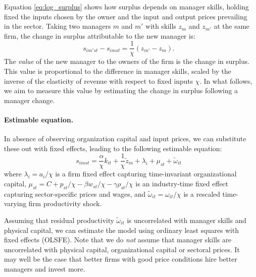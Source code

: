\documentclass[11pt,a4paper]{article}
\begin{document}
Equation \eqref{eq:log_surplus} shows how surplus depends on manager skills, holding fixed the inputs chosen by the owner and the input and output prices prevailing in the sector. Taking two managers $m$ and $m'$ with skills ${z}_m$ and ${z}_{m'}$ at the same firm, the change in surplus attributable to the new manager is:
\begin{equation}\label{eq:manager_change}
s_{im'st} - s_{imst} = \frac1\chi({z}_{m'} - {z}_{m}).
\end{equation}
The \emph{value} of the new manager to the owners of the firm is the change in surplus. This value is proportional to the difference in manager skills, scaled by the inverse of the elasticity of revenue with respect to fixed inputs $\chi$. In what follows, we aim to measure this value by estimating the change in surplus following a manager change.

\paragraph{Estimable equation.} In absence of observing organization capital and input prices, we can substitute these out with fixed effects, leading to the following estimable equation:
\begin{equation}\label{eq:estimation}
s_{imst} = \frac\alpha\chi k_{it}  + \frac1\chi\tilde{z}_m + \lambda_i + \mu_{st} + \tilde \omega_{it}
\end{equation}
where $\lambda_i = a_i/\chi$ is a firm fixed effect capturing time-invariant organizational capital, $\mu_{st} = C + p_{st}/\chi - \beta w_{st}/\chi - \gamma\rho_{st}/\chi$ is an industry-time fixed effect capturing sector-specific prices and wages, and $\tilde\omega_{it} = \omega_{it}/\chi$ is a rescaled time-varying firm productivity shock. 

Assuming that residual productivity $\tilde\omega_{it}$ is uncorrelated with manager skills and physical capital, we can estimate the model using ordinary least squares with fixed effects (OLSFE). Note that we do \emph{not} assume that manager skills are uncorrelated with physical capital, organizational capital or sectoral prices. It may well be the case that better firms with good price conditions hire better managers and invest more. 
\end{document}
